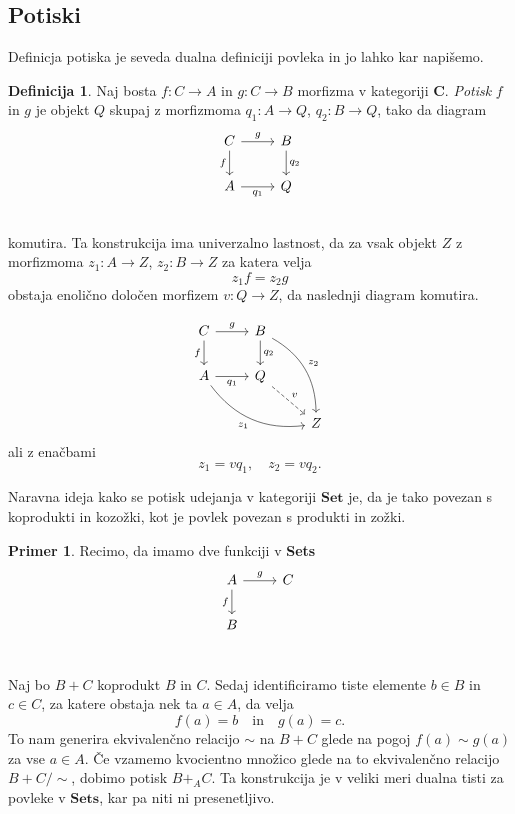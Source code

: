 \documentclass[12pt,a4paper]{book}
\theoremstyle{definition}
\newtheorem{definicija}{Definicija}[chapter]
\theoremstyle{plain}
\theoremstyle{definition}
\newtheorem{primer}{Primer}[section]
\theoremstyle{remark}
\newcommand{\cat}[1]{\textbf{#1}}
\begin{document}
\subsection{Potiski}

Definicja potiska je seveda dualna definiciji povleka in jo lahko kar napišemo.

\begin{definicija}
Naj bosta $f: C \to A$ in $g : C \to B$ morfizma v kategoriji $\cat{C}$. \emph{Potisk} $f$ in $g$ je objekt $Q$ skupaj z morfizmoma $q_1 : A \to Q$, $q_2 : B \to Q$, tako da diagram
$$\begin{tikzcd}
C \ar[r, "g"] \ar[d, "f"'] & B \ar[d, "q_2"] \\
A \ar[r, "q_1"'] & Q \\
\end{tikzcd}$$
komutira. Ta konstrukcija ima univerzalno lastnost, da za vsak objekt $Z$ z morfizmoma $z_1 : A \to Z$, $z_2 : B \to Z$ za katera velja $$z_1f = z_2g$$
obstaja enolično določen morfizem $v : Q \to Z$, da naslednji diagram komutira.

$$\begin{tikzcd}
C \ar[r, "g"] \ar[d, "f"'] & B \ar[d, "q_2"] \ar[ddr, bend left, "z_2"] & \\
A \ar[r, "q_1"'] \ar[drr, bend right, "z_1"'] & Q \ar[dr, dashed, "v"] & \\
& & Z 
\end{tikzcd}$$
ali z enačbami $$z_1 = v q_1, \quad z_2 = v q_2.$$
\end{definicija}

Naravna ideja kako se potisk udejanja v kategoriji $\cat{Set}$ je, da je tako povezan s koprodukti in kozožki, kot je povlek povezan s produkti in zožki.

\begin{primer}
Recimo, da imamo dve funkciji v \cat{Sets}
$$ \begin{tikzcd}
A \ar[d, "f"'] \ar[r, "g"] & C \\
B & \\
\end{tikzcd} $$

Naj bo $B + C$ koprodukt $B$ in $C$. Sedaj identificiramo tiste elemente $b \in B$ in $c \in C$, za katere obstaja nek ta $a \in A$, da velja
$$f(a) = b \quad \text{in} \quad g(a) = c.$$
To nam generira ekvivalenčno relacijo $\sim$ na $B + C$ glede na pogoj $f(a) \sim g(a)$ za vse $a \in A$. Če vzamemo kvocientno množico glede na to ekvivalenčno relacijo $B + C/\sim$, dobimo potisk $B +_A C$. Ta konstrukcija je v veliki meri dualna tisti za povleke v $\cat{Sets}$, kar pa niti ni presenetljivo.

\end{primer}
\end{document}
